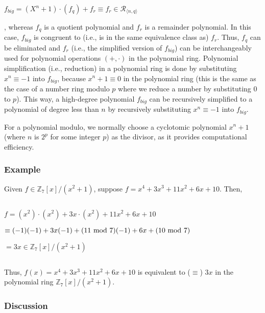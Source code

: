 $f_{big} = (X^n + 1)\cdot(f_q) + f_r \equiv f_r \in \mathcal{R}_{\langle n, q \rangle}$

\noindent, whereas $f_q$ is a quotient polynomial and $f_r$ is a remainder polynomial. In this case, $f_{big}$ is congruent to (i.e., is in the same equivalence class as) $f_r$. Thus, $f_q$ can be eliminated and $f_r$ (i.e., the simplified version of $f_{big}$) can be interchangeably used for polynomial operations $(+, \cdot)$ in the polynomial ring. 
Polynomial simplification (i.e., reduction) in a polynomial ring is done by substituting $x^n \equiv -1$ into $f_{big}$, because $x^n + 1 \equiv 0$ in the polynomial ring (this is the same as the case of a number ring modulo $p$ where we reduce a number by substituting $0$ to $p$). This way, a high-degree polynomial $f_{big}$ can be recursively simplified to a polynomial of degree less than $n$ by recursively substituting $x^n \equiv -1$ into $f_{big}$.

For a polynomial modulo, we normally choose a cyclotomic polynomial $x^n + 1$ (where $n$ is $2^p$ for some integer $p$) as the divisor, as it provides computational efficiency. 

\subsubsection{Example}
\label{subsubsec:poly-ring-ex}
Given $f \in \mathbb{Z}_7[x] / (x^2 + 1)$, suppose $f = x^4 + 3x^3 + 11x^2 + 6x + 10$. Then, 

$ $

$f = (x^2)\cdot(x^2) + 3x\cdot(x^2) + 11x^2 + 6x + 10$ 

$ \equiv (-1)(-1) + 3x(-1) +  (11 \text{ } \text{\text{mod}} \text{ } 7)(-1) + 6x + (10 \text{ } \text{\text{mod}} \text{ } 7)$

$ = 3x \in \mathbb{Z}_7[x] / (x^2 + 1)$

$ $

\noindent Thus, $f(x) = x^4 + 3x^3 + 11x^2 + 6x + 10$ is equivalent to ($\equiv$) $3x$ in the polynomial ring $\mathbb{Z}_7[x] / (x^2 + 1)$.


\subsubsection{Discussion}
\label{subsubsec:polynomial-ring-discuss}

